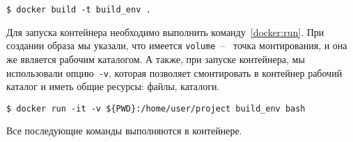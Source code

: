 \begin{lstlisting}[caption={Сборка образа}, label={docker:build}]
$ docker build -t build_env .
\end{lstlisting}

Для запуска контейнера необходимо выполнить команду~\ref{docker:run}. При создании
образа мы указали, что имеется \texttt{volume}~--~ точка монтирования, и она же
является рабочим каталогом. А также, при запуске контейнера, мы использовали
опцию~\texttt{-v}, которая позволяет смонтировать в контейнер рабочий каталог и
иметь общие ресурсы: файлы, каталоги.

\begin{lstlisting}[caption={Запуск контейнера}, label={docker:run}]
$ docker run -it -v ${PWD}:/home/user/project build_env bash
\end{lstlisting}

Все последующие команды выполняются в контейнере.
